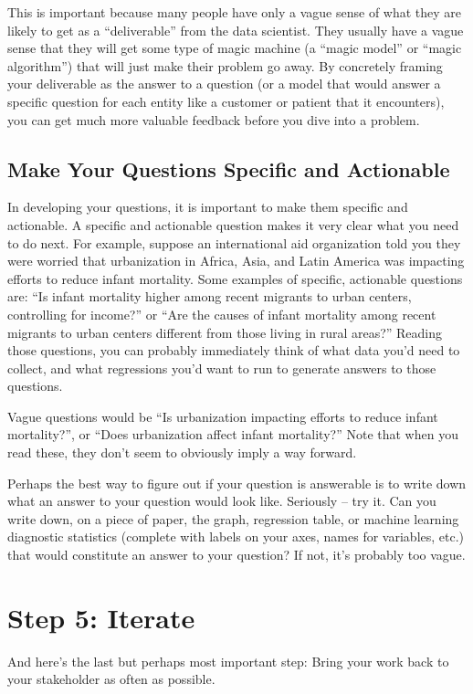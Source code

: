 \documentclass[letterpaper,10pt,english]{jupyterBook}
\begin{document}
\sphinxAtStartPar
This is important because many people have only a vague sense of what they are likely to get as a “deliverable” from the data scientist. They usually have a vague sense that they will get some type of magic machine (a “magic model” or “magic algorithm”) that will just make their problem go away. By concretely framing your deliverable as the answer to a question (or a model that would answer a specific question for each entity like a customer or patient that it encounters), you can get much more valuable feedback before you dive into a problem.


\subsection{Make Your Questions Specific and Actionable}
\label{\detokenize{20_problems_to_questions/20_stakeholder_management:make-your-questions-specific-and-actionable}}
\sphinxAtStartPar
In developing your questions, it is important to make them specific and actionable. A specific and actionable question makes it very clear what you need to do next. For example, suppose an international aid organization told you they were worried that urbanization in Africa, Asia, and Latin America was impacting efforts to reduce infant mortality. Some examples of specific, actionable questions are: “Is infant mortality higher among recent migrants to urban centers, controlling for income?” or “Are the causes of infant mortality among recent migrants to urban centers different from those living in rural areas?” Reading those questions, you can probably immediately think of what data you’d need to collect, and what regressions you’d want to run to generate answers to those questions.

\sphinxAtStartPar
Vague questions would be “Is urbanization impacting efforts to reduce infant mortality?”, or “Does urbanization affect infant mortality?” Note that when you read these, they don’t seem to obviously imply a way forward.

\sphinxAtStartPar
Perhaps the best way to figure out if your question is answerable is to write down what an answer to your question would look like. Seriously – try it. Can you write down, on a piece of paper, the graph, regression table, or machine learning diagnostic statistics (complete with labels on your axes, names for variables, etc.) that would constitute an answer to your question? If not, it’s probably too vague.


\section{Step 5: Iterate}
\label{\detokenize{20_problems_to_questions/20_stakeholder_management:step-5-iterate}}
\sphinxAtStartPar
And here’s the last but perhaps most important step:  Bring your work back to your stakeholder as often as possible.
\end{document}
